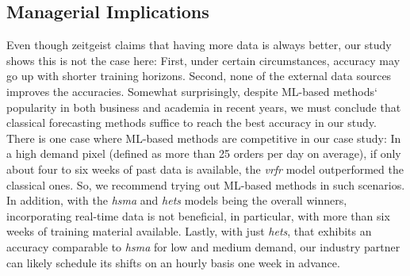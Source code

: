 \subsection{Managerial Implications}
\label{implications}

Even though zeitgeist claims that having more data is always better, our study
    shows this is not the case here:
First, under certain circumstances, accuracy may go up with shorter training
    horizons.
Second, none of the external data sources improves the accuracies.
Somewhat surprisingly, despite ML-based methods` popularity in both business
    and academia in recent years, we must conclude that classical forecasting
    methods suffice to reach the best accuracy in our study.
There is one case where ML-based methods are competitive in our case study:
    In a high demand pixel (defined as more than 25 orders per day on average),
    if only about four to six weeks of past data is available,
    the \textit{vrfr} model outperformed the classical ones.
So, we recommend trying out ML-based methods in such scenarios.
In addition, with the \textit{hsma} and \textit{hets} models being the overall
    winners, incorporating real-time data is not beneficial, in particular,
    with more than six weeks of training material available.
Lastly, with just \textit{hets}, that exhibits an accuracy comparable to
    \textit{hsma} for low and medium demand, our industry partner can likely
    schedule its shifts on an hourly basis one week in advance.

